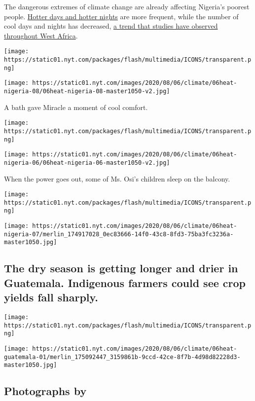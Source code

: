 The dangerous extremes of climate change are already affecting Nigeria's
poorest people.
\href{https://rmets.onlinelibrary.wiley.com/doi/10.1002/met.1791}{Hotter
days and hotter nights} are more frequent, while the number of cool days
and nights has decreased,
\href{https://www.ipcc.ch/site/assets/uploads/2018/02/WGIIAR5-Chap22_FINAL.pdf}{a
trend that studies have observed throughout West Africa}.

\texttt{[image: https://static01.nyt.com/packages/flash/multimedia/ICONS/transparent.png]}

\texttt{[image: https://static01.nyt.com/images/2020/08/06/climate/06heat-nigeria-08/06heat-nigeria-08-master1050-v2.jpg]}

A bath gave Miracle a moment of cool comfort.

\texttt{[image: https://static01.nyt.com/packages/flash/multimedia/ICONS/transparent.png]}

\texttt{[image: https://static01.nyt.com/images/2020/08/06/climate/06heat-nigeria-06/06heat-nigeria-06-master1050-v2.jpg]}

When the power goes out, some of Ms. Osi's children sleep on the
balcony.

\texttt{[image: https://static01.nyt.com/packages/flash/multimedia/ICONS/transparent.png]}

\texttt{[image: https://static01.nyt.com/images/2020/08/06/climate/06heat-nigeria-07/merlin\_174917028\_0ec83666-14f0-43c8-8fd3-75ba3fc3236a-master1050.jpg]}

\hypertarget{the-dry-season-is-getting-longer-and-drier-in-guatemala-indigenous-farmers-could-see-crop-yields-fall-sharply}{%
\subsection{The dry season is getting longer and drier in Guatemala.
Indigenous farmers could see crop yields fall
sharply.}\label{the-dry-season-is-getting-longer-and-drier-in-guatemala-indigenous-farmers-could-see-crop-yields-fall-sharply}}

\texttt{[image: https://static01.nyt.com/packages/flash/multimedia/ICONS/transparent.png]}

\texttt{[image: https://static01.nyt.com/images/2020/08/06/climate/06heat-guatemala-01/merlin\_175092447\_3159861b-9ccd-42ce-8f7b-4d98d82228d3-master1050.jpg]}

\hypertarget{photographs-by-3}{%
\subsection{Photographs by}\label{photographs-by-3}}

